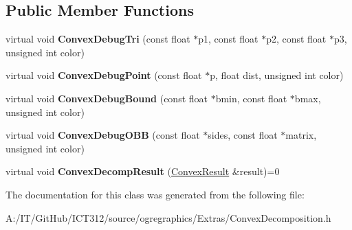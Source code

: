 \subsection*{Public Member Functions}
\begin{DoxyCompactItemize}
\item 
\hypertarget{class_convex_decomposition_1_1_convex_decomp_interface_ade260062de37fce5e72918240bdf7750}{virtual void {\bfseries Convex\-Debug\-Tri} (const float $\ast$p1, const float $\ast$p2, const float $\ast$p3, unsigned int color)}\label{class_convex_decomposition_1_1_convex_decomp_interface_ade260062de37fce5e72918240bdf7750}

\item 
\hypertarget{class_convex_decomposition_1_1_convex_decomp_interface_a4eb2606379b4d7cea0b8122dfbd17a7b}{virtual void {\bfseries Convex\-Debug\-Point} (const float $\ast$p, float dist, unsigned int color)}\label{class_convex_decomposition_1_1_convex_decomp_interface_a4eb2606379b4d7cea0b8122dfbd17a7b}

\item 
\hypertarget{class_convex_decomposition_1_1_convex_decomp_interface_a57ef84132a1c95862f543eb249f96d77}{virtual void {\bfseries Convex\-Debug\-Bound} (const float $\ast$bmin, const float $\ast$bmax, unsigned int color)}\label{class_convex_decomposition_1_1_convex_decomp_interface_a57ef84132a1c95862f543eb249f96d77}

\item 
\hypertarget{class_convex_decomposition_1_1_convex_decomp_interface_a3ae71f8a41bdffd2e0ad7bba985fc46a}{virtual void {\bfseries Convex\-Debug\-O\-B\-B} (const float $\ast$sides, const float $\ast$matrix, unsigned int color)}\label{class_convex_decomposition_1_1_convex_decomp_interface_a3ae71f8a41bdffd2e0ad7bba985fc46a}

\item 
\hypertarget{class_convex_decomposition_1_1_convex_decomp_interface_a23b944ece0d378c5ced4eed6e66ae14a}{virtual void {\bfseries Convex\-Decomp\-Result} (\hyperlink{class_convex_decomposition_1_1_convex_result}{Convex\-Result} \&result)=0}\label{class_convex_decomposition_1_1_convex_decomp_interface_a23b944ece0d378c5ced4eed6e66ae14a}

\end{DoxyCompactItemize}


The documentation for this class was generated from the following file\-:\begin{DoxyCompactItemize}
\item 
A\-:/\-I\-T/\-Git\-Hub/\-I\-C\-T312/source/ogregraphics/\-Extras/Convex\-Decomposition.\-h\end{DoxyCompactItemize}

